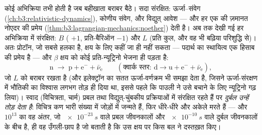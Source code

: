\begin{proposition}[कण-अभिक्रियाओं के संरक्षण-नियम]\label{prop:b3:particle-physics:conservation}
कोई अभिक्रिया तभी होती है जब बहीखाता बराबर बैठे। सदा
संरक्षित: ऊर्जा--संवेग
(\cref{ch:b3:relativistic-dynamics}), कोणीय संवेग, और
विद्युत् आवेश --- और हर एक की ज़मानत नोएदर की प्रमेय
(\cref{thm:b3:lagrangian-mechanics:noether}) देती है।
अब तक देखी गई हर अभिक्रिया में संरक्षित: \emph{}
$B$ ( $+1$, प्रति-बैरिऑन $-1$) और \emph{}
$L$ (प्रति कुल, और वह भी बढ़िया परिशुद्धि से)। अतः प्रोटॉन, जो सबसे
हलका  है, क्षय के लिए कहीं जा ही नहीं सकता --- पदार्थ का
स्थायित्व एक हिसाब की प्रमेय है --- और $\beta$ क्षय को कोई
प्रति-न्यूट्रिनो भेजना ही पड़ता है:
\[
\text{n} \;\to\; \text{p} + \text{e}^- + \bar\nu_{\text{e}}
\qquad (\text{क्वार्क स्तर: } \text{d} \to \text{u} +
\text{e}^- + \bar\nu_{\text{e}}) ,
\]
जो $L$ को बराबर रखता है (और इलेक्ट्रॉन का सतत ऊर्जा-वर्णक्रम भी
समझा देता है, जिसने ऊर्जा-संरक्षण में भौतिकी का विश्वास
लगभग तोड़ ही दिया था, इससे पहले कि पाउली ने उसे बचाने के लिए
न्यूट्रिनो गढ़ लिया)।
स्वाद (विचित्रता, चार्म) प्रबल तथा
विद्युत्-चुंबकीय प्रक्रियाओं में संरक्षित रहते हैं पर \emph{दुर्बल
उन्हें तोड़ देता है}: विचित्र
कण भारी संख्या में जोड़ों में जन्मते हैं, फिर धीरे-धीरे और अकेले मरते
हैं --- और $10^{13}$ का वह अंतर, जो $\qty{e-23}{s}$ वाले प्रबल
जीवनकालों और $\qty{e-10}{s}$ वाले दुर्बल जीवनकालों के बीच है, ही
वह उँगली-छाप है जो बताती है कि उस क्षय पर किस बल ने दस्तख़त किए।
\end{proposition}
\admitted

